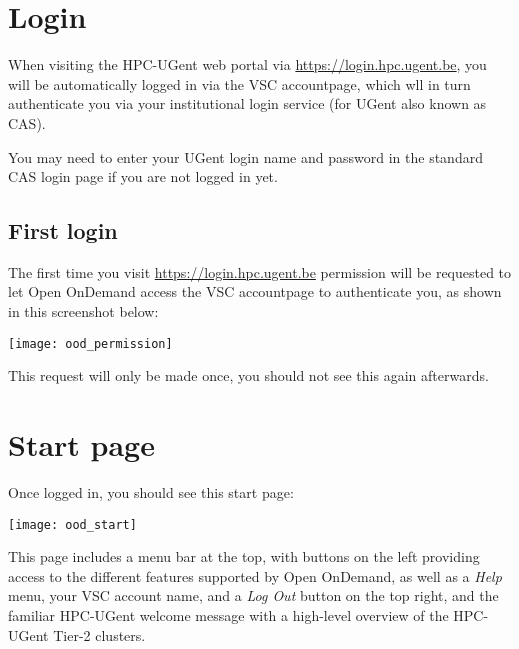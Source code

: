 

\section{Login}

When visiting the HPC-UGent web portal via \url{https://login.hpc.ugent.be},
you will be automatically logged in via the VSC accountpage, which wll in turn
authenticate you via your institutional login service (for UGent also known as CAS).

You may need to enter your UGent login name and password in the standard CAS login page if you are not logged in yet.

\subsection{First login}

The first time you visit \url{https://login.hpc.ugent.be} permission will be requested to let Open OnDemand
access the VSC accountpage to authenticate you, as shown in this screenshot below:

\begin{center}
    \texttt{[image: ood\_permission]}
\end{center}


This request will only be made once, you should not see this again afterwards.

\section{Start page}

Once logged in, you should see this start page:

\begin{center}
    \texttt{[image: ood\_start]}
\end{center}

This page includes a menu bar at the top, with buttons on the left providing access to the different features supported by Open OnDemand,
as well as a \emph{Help} menu, your VSC account name, and a \emph{Log Out} button on the top right,
and the familiar HPC-UGent welcome message with a high-level overview of the HPC-UGent Tier-2 clusters.

